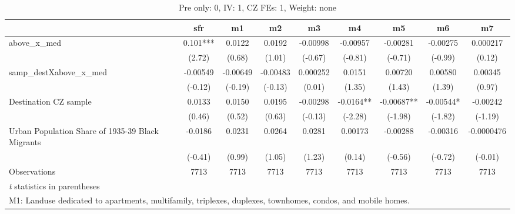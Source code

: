 \begin{table}[htbp]\centering
\def\sym#1{\ifmmode^{#1}\else\(^{#1}\)\fi}
\caption{Pre only: 0, IV: 1, CZ FEs: 1, Weight: none}
\begin{tabular}{l*{8}{c}}
\toprule
                    &\multicolumn{1}{c}{sfr}&\multicolumn{1}{c}{m1}&\multicolumn{1}{c}{m2}&\multicolumn{1}{c}{m3}&\multicolumn{1}{c}{m4}&\multicolumn{1}{c}{m5}&\multicolumn{1}{c}{m6}&\multicolumn{1}{c}{m7}\\
\midrule
above\_x\_med         &       0.101***&      0.0122   &      0.0192   &    -0.00998   &    -0.00957   &    -0.00281   &    -0.00275   &    0.000217   \\
                    &      (2.72)   &      (0.68)   &      (1.01)   &     (-0.67)   &     (-0.81)   &     (-0.71)   &     (-0.99)   &      (0.12)   \\
\addlinespace
samp\_destXabove\_x\_med&    -0.00549   &    -0.00649   &    -0.00483   &    0.000252   &      0.0151   &     0.00720   &     0.00580   &     0.00345   \\
                    &     (-0.12)   &     (-0.19)   &     (-0.13)   &      (0.01)   &      (1.35)   &      (1.43)   &      (1.39)   &      (0.97)   \\
\addlinespace
Destination CZ sample&      0.0133   &      0.0150   &      0.0195   &    -0.00298   &     -0.0164** &    -0.00687** &    -0.00544*  &    -0.00242   \\
                    &      (0.46)   &      (0.52)   &      (0.63)   &     (-0.13)   &     (-2.28)   &     (-1.98)   &     (-1.82)   &     (-1.19)   \\
\addlinespace
Urban Population Share of 1935-39 Black Migrants&     -0.0186   &      0.0231   &      0.0264   &      0.0281   &     0.00173   &    -0.00288   &    -0.00316   &  -0.0000476   \\
                    &     (-0.41)   &      (0.99)   &      (1.05)   &      (1.23)   &      (0.14)   &     (-0.56)   &     (-0.72)   &     (-0.01)   \\
\midrule
Observations        &        7713   &        7713   &        7713   &        7713   &        7713   &        7713   &        7713   &        7713   \\
\bottomrule
\multicolumn{9}{l}{\footnotesize \textit{t} statistics in parentheses}\\
\multicolumn{9}{l}{\footnotesize M1: Landuse dedicated to apartments, multifamily, triplexes, duplexes, townhomes, condos, and mobile homes.}\\

\end{tabular}
\end{table}
